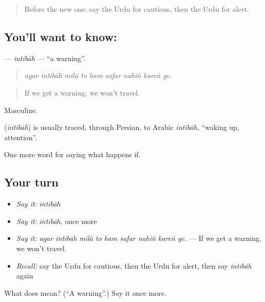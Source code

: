 \begin{quote}
Before the new one: say the Urdu for cautious, then the Urdu for alert.
\end{quote}

\subsection*{You'll want to know: }
\textbf{} — \emph{intibāh} — \textquotedblleft{}a warning\textquotedblright{}.

\begin{quote}
        
\end{quote}

\begin{quote}
\emph{agar intibāh milā to ham safar nahīṅ kareṅ ge.}
\end{quote}

\begin{quote}
If we get a warning, we won't travel.
\end{quote}

Masculine.

\begin{cousinweb}
\textbf{} (\emph{intibāh}) is usually traced, through Persian, to Arabic \emph{intibāh}, \textquotedblleft{}waking up, attention\textquotedblright{}.
\end{cousinweb}

\begin{grammarlens}[title={What you've built}]
One more word for saying what happens if.
\end{grammarlens}

\subsection*{Your turn}
\begin{itemize}
\raggedright
  \item \emph{Say it:} \emph{intibāh}
  \item \emph{Say it:} \emph{intibāh}, once more
  \item \emph{Say it:} \emph{agar intibāh milā to ham safar nahīṅ kareṅ ge.} — If we get a warning, we won't travel.
  \item \emph{Recall:} say the Urdu for cautious, then the Urdu for alert, then say \emph{intibāh} again
\end{itemize}

\begin{tcolorbox}[breakable,colback=teal!4,colframe=teal!35!black,title={Before you move on}]
What does  mean? (\textquotedblleft{}A warning\textquotedblright{}.) Say it once more.
\end{tcolorbox}
